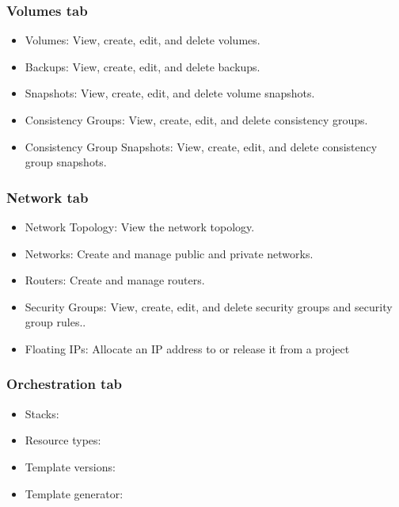 \subsubsection{\texorpdfstring{Volumes
tab}{Volumes tab}}\label{volumes-tab}

\begin{itemize}
\item
  Volumes: View, create, edit, and delete volumes.
\item
  Backups: View, create, edit, and delete backups.
\item
  Snapshots: View, create, edit, and delete volume snapshots.
\item
  Consistency Groups: View, create, edit, and delete consistency groups.
\item
  Consistency Group Snapshots: View, create, edit, and delete
  consistency group snapshots.
\end{itemize}

\subsubsection{\texorpdfstring{Network
tab}{Network tab}}\label{network-tab}

\begin{itemize}
\item
  Network Topology: View the network topology.
\item
  Networks: Create and manage public and private networks.
\item
  Routers: Create and manage routers.
\item
  Security Groups: View, create, edit, and delete security groups and
  security group rules..
\item
  Floating IPs: Allocate an IP address to or release it from a project
\end{itemize}

\subsubsection{\texorpdfstring{Orchestration
tab}{Orchestration tab}}\label{orchestration-tab}

\begin{itemize}
\item
  Stacks:
\item
  Resource types:
\item
  Template versions:
\item
  Template generator:
\end{itemize}

